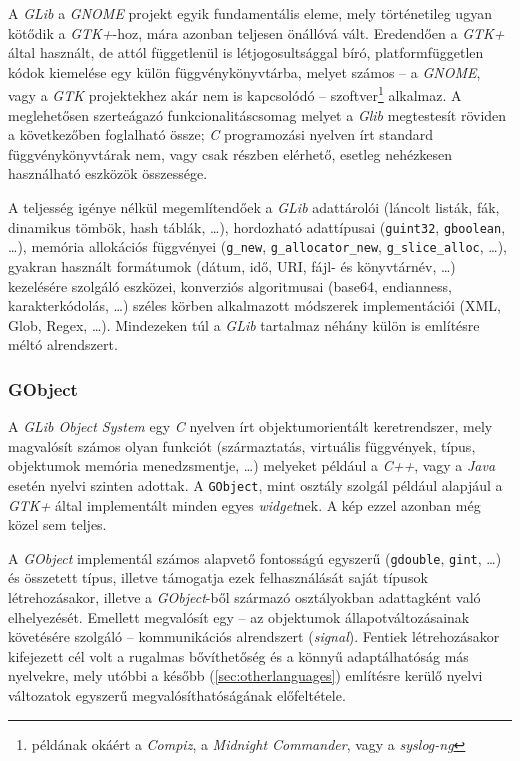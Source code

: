 A \textit{GLib} a \textit{GNOME} projekt egyik fundamentális eleme, mely történetileg ugyan kötődik a \textit{GTK+}-hoz, mára azonban teljesen önállóvá vált. Eredendően a \textit{GTK+} által használt, de attól függetlenül is létjogosultsággal bíró, platformfüggetlen kódok kiemelése egy külön függvénykönyvtárba, melyet számos -- a \textit{GNOME}, vagy a \textit{GTK} projektekhez akár nem is kapcsolódó -- szoftver\footnote{példának okáért a \textit{Compiz}, a \textit{Midnight Commander}, vagy a \textit{syslog-ng}} alkalmaz. A meglehetősen szerteágazó funkcionalitáscsomag melyet a \textit{Glib} megtestesít röviden a következőben foglalható össze; \textit{C} programozási nyelven írt standard függvénykönyvtárak nem, vagy csak részben elérhető, esetleg nehézkesen használható eszközök összessége.

A teljesség igénye nélkül megemlítendőek a \textit{GLib} adattárolói (láncolt listák, fák, dinamikus tömbök, hash táblák, \dots), hordozható adattípusai (\texttt{guint32}, \texttt{gboolean}, \dots), memória allokációs függvényei (\texttt{g\_new}, \texttt{g\_allocator\_new}, \texttt{g\_slice\_alloc}, \dots), gyakran használt formátumok (dátum, idő, URI, fájl- és könyvtárnév, \dots) kezelésére szolgáló eszközei, konverziós algoritmusai (base64, endianness, karakterkódolás, \dots) széles körben alkalmazott módszerek implementációi (XML, Glob, Regex, \dots). Mindezeken túl a \textit{GLib} tartalmaz néhány külön is említésre méltó alrendszert.

\subsubsection{GObject}

A \textit{GLib Object System} egy \textit{C} nyelven írt objektumorientált keretrendszer, mely magvalósít számos olyan funkciót (származtatás, virtuális függvények, típus, objektumok memória menedzsmentje, \dots) melyeket például a \textit{C++}, vagy a \textit{Java} esetén nyelvi szinten adottak. A \texttt{GObject}, mint osztály szolgál például alapjául a \textit{GTK+} által implementált minden egyes \textit{widget}nek. A kép ezzel azonban még közel sem teljes.

A \textit{GObject} implementál számos alapvető fontosságú egyszerű (\texttt{gdouble}, \texttt{gint}, \dots) és összetett típus, illetve támogatja ezek felhasználását saját típusok létrehozásakor, illetve a \textit{GObject}-ből származó osztályokban adattagként való elhelyezését. Emellett megvalósít egy -- az objektumok állapotváltozásainak követésére szolgáló -- kommunikációs alrendszert (\textit{signal}).  Fentiek létrehozásakor kifejezett cél volt a rugalmas bővíthetőség és a könnyű adaptálhatóság más nyelvekre, mely utóbbi a később (\ref{sec:otherlanguages}) említésre kerülő nyelvi változatok egyszerű megvalósíthatóságának előfeltétele.

